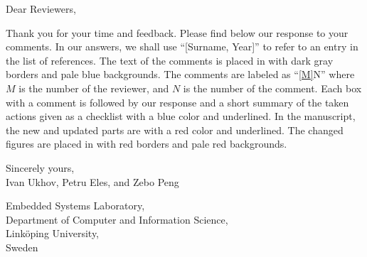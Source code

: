 Dear Reviewers,

\vspace{2em}
\noindent Thank you for your time and feedback. Please find below our response
to your comments. In our answers, we shall use ``[Surname, Year]'' to refer to
an entry in the list of references. The text of the comments is placed in
 with dark gray borders and pale blue backgrounds. The
comments are labeled as ``\cref{M}{N}'' where $M$ is the number of the reviewer,
and $N$ is the number of the comment. Each box with a comment is followed by our
response and a short summary of the taken actions given as a checklist
 with a blue color and underlined. In the manuscript, the new
and updated parts are  with a red color and underlined. The
changed figures are placed in  with red borders and pale red
backgrounds.

\vspace{2em}
\noindent Sincerely yours,\\
Ivan Ukhov, Petru Eles, and Zebo Peng

\vspace{1em}
\noindent Embedded Systems Laboratory,\\
Department of Computer and Information Science,\\
Link\"{o}ping University,\\
Sweden

$ $
